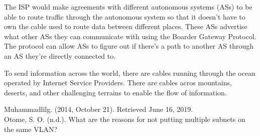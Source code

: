 The ISP would make agreements with different autonomous systems (ASs) to be able to route traffic through the autonomous system so that it doesn’t have to own the cable used to route data between different places. These ASs advertise what other ASs they can communicate with using the Boarder Gateway Protocol. The protocol can allow ASs to figure out if there’s a path to another AS through an AS they’re directly connected to.

To send information across the world, there are cables running through the ocean operated by Internet Service Providers. There are cables acros mountains, deserts, and other challenging terrains to enable the flow of information.


Muhammadlilg. (2014, October 21). Retrieved June 16, 2019.\\

Otome, S. O. (n.d.). What are the reasons for not putting multiple subnets on the same VLAN?
